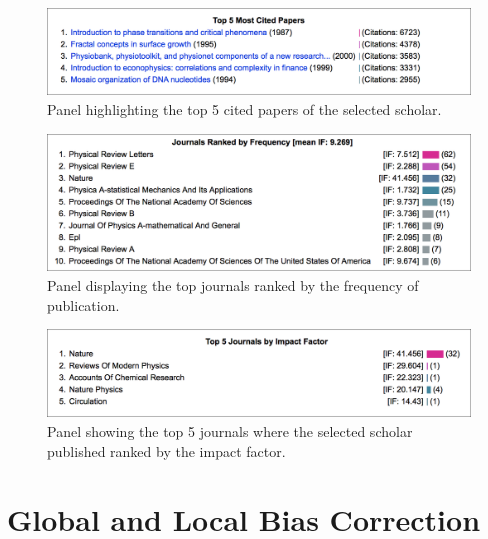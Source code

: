 \begin{figure}[H]
    \centering
    \includegraphics[width=\textwidth]{figures/fig_panel3-N}
    \caption{Panel highlighting the top 5 cited papers of the selected scholar.}
    \label{fig:panel3}
\end{figure}

\begin{figure}[H]
    \centering
    \includegraphics[width=\textwidth]{figures/fig_panel2-N}
    \caption{Panel displaying the top journals ranked by the frequency of publication.}
    \label{fig:panel2}
\end{figure}

\begin{figure}[H]
    \centering
    \includegraphics[width=\textwidth]{figures/fig_panel4-N}
    \caption{Panel showing the top 5 journals where the selected scholar published ranked by the impact factor.}
    \label{fig:panel4}
\end{figure}




\section{Global and Local Bias Correction}

